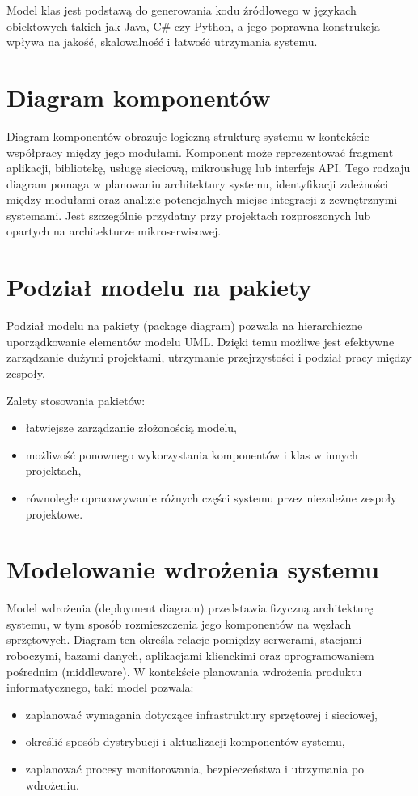 \documentclass[12pt,a4paper]{article}
\begin{document}
Model klas jest podstawą do generowania kodu źródłowego w językach obiektowych takich jak Java, C\# czy Python, a jego poprawna konstrukcja wpływa na jakość, skalowalność i łatwość utrzymania systemu.

\section{Diagram komponentów}

Diagram komponentów obrazuje logiczną strukturę systemu w kontekście współpracy między jego modułami. Komponent może reprezentować fragment aplikacji, bibliotekę, usługę sieciową, mikrousługę lub interfejs API.
Tego rodzaju diagram pomaga w planowaniu architektury systemu, identyfikacji zależności między modułami oraz analizie potencjalnych miejsc integracji z zewnętrznymi systemami. Jest szczególnie przydatny przy projektach rozproszonych lub opartych na architekturze mikroserwisowej.

\section{Podział modelu na pakiety}

Podział modelu na pakiety (package diagram) pozwala na hierarchiczne uporządkowanie elementów modelu UML. Dzięki temu możliwe jest efektywne zarządzanie dużymi projektami, utrzymanie przejrzystości i podział pracy między zespoły.

Zalety stosowania pakietów:
\begin{itemize}
\item łatwiejsze zarządzanie złożonością modelu,
\item możliwość ponownego wykorzystania komponentów i klas w innych projektach,
\item równoległe opracowywanie różnych części systemu przez niezależne zespoły projektowe.
\end{itemize}

\section{Modelowanie wdrożenia systemu}

Model wdrożenia (deployment diagram) przedstawia fizyczną architekturę systemu, w tym sposób rozmieszczenia jego komponentów na węzłach sprzętowych.
Diagram ten określa relacje pomiędzy serwerami, stacjami roboczymi, bazami danych, aplikacjami klienckimi oraz oprogramowaniem pośrednim (middleware).
W kontekście planowania wdrożenia produktu informatycznego, taki model pozwala:
\begin{itemize}
\item zaplanować wymagania dotyczące infrastruktury sprzętowej i sieciowej,
\item określić sposób dystrybucji i aktualizacji komponentów systemu,
\item zaplanować procesy monitorowania, bezpieczeństwa i utrzymania po wdrożeniu.
\end{itemize}
\end{document}
